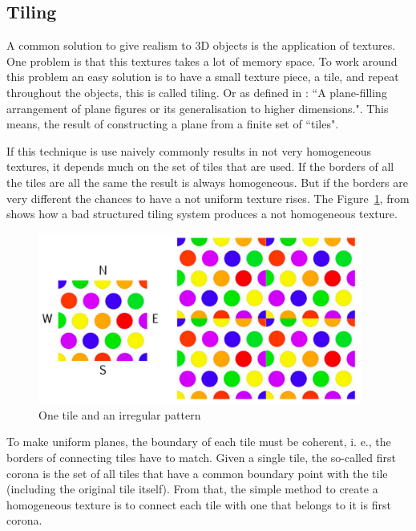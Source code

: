
\subsection{Tiling} %
\label{ssub:tiling}

A common solution to give realism to 3D objects is the application of textures. One problem is that this textures takes a lot of memory space. To work around this problem an easy solution is to have a small texture piece, a tile, and repeat throughout the objects, this is called tiling. Or as defined in \cite{TilingWOLFRAM}: ``A plane-filling arrangement of plane figures or its generalisation to higher dimensions.".  This means, the result of constructing a plane from a finite set of ``tiles". 

If this technique is use naively commonly results in not very homogeneous textures, it depends much on the set of tiles that are used. If the borders of all the tiles are all the same the result is always homogeneous. But if the borders are very different the chances to have a not uniform texture rises. The Figure~\ref{fig:TIrregulartexture}, from \cite{ProcWorld} shows how a bad structured tiling system produces a not homogeneous texture.  


\begin{figure}[htbp]
	\centering
	\includegraphics[width=0.95\textwidth]{img/Theory/Tiling/iregular.png}
	\caption{One tile and an irregular pattern}
	\label{fig:TIrregulartexture}
\end{figure}


To make uniform planes, the boundary of each tile must be coherent, i. e., the borders of connecting tiles have to match. Given a single tile, the so-called first corona is the set of all tiles that have a common boundary point with the tile (including the original tile itself). From that, the simple method to create a homogeneous texture is to connect each tile with one that belongs to it is first corona.

